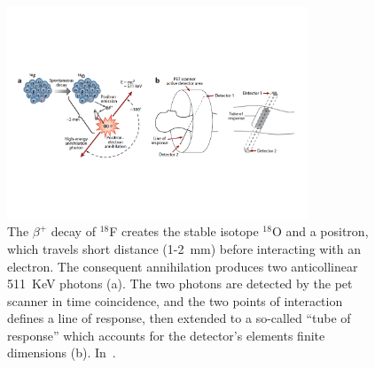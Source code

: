 \begin{figure}[!htbp]
\centering
\includegraphics[width=0.8\textwidth, trim = {0 3cm 0 3cm}, clip]{03_GraphicFiles/chapter1_Introduction/NM_PET_principle.pdf}
\caption{The $\beta^{+}$ decay of $^{18}$F creates the stable isotope $^{18}$O and a positron, which travels short distance (1-2~mm) before interacting with an electron. The consequent annihilation produces two anticollinear 511~KeV photons (a). The two photons are detected by the \gls{pet} scanner in time coincidence, and the two points of interaction defines a line of response, then extended to a so-called \enquote{tube of response} which accounts for the detector's elements finite dimensions (b). In~\cite{Vaquero2015}.}
\label{chap2::fig::NM_PET_princ}
\end{figure}   

